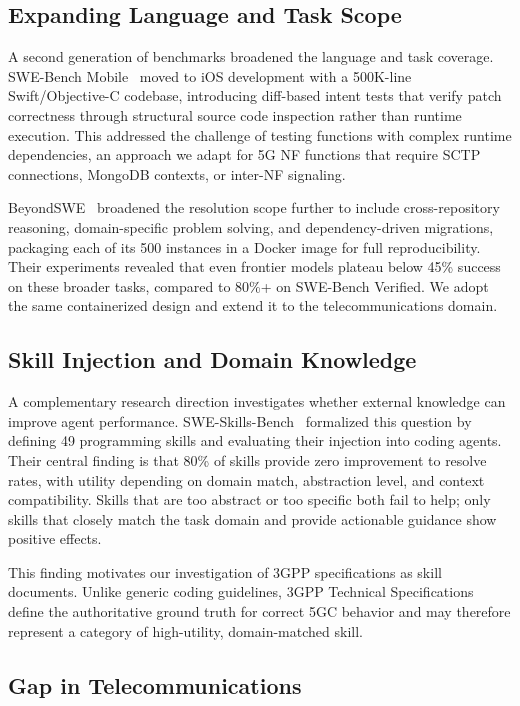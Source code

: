 \documentclass[10pt,conference]{IEEEtran}
\begin{document}
\subsection{Expanding Language and Task Scope}

A second generation of benchmarks broadened the language and task coverage. SWE-Bench Mobile~\cite{yao2025swebenchmobile} moved to iOS development with a 500K-line Swift/Objective-C codebase, introducing diff-based intent tests that verify patch correctness through structural source code inspection rather than runtime execution. This addressed the challenge of testing functions with complex runtime dependencies, an approach we adapt for 5G NF functions that require SCTP connections, MongoDB contexts, or inter-NF signaling.

BeyondSWE~\cite{shi2025beyondswe} broadened the resolution scope further to include cross-repository reasoning, domain-specific problem solving, and dependency-driven migrations, packaging each of its 500 instances in a Docker image for full reproducibility. Their experiments revealed that even frontier models plateau below 45\% success on these broader tasks, compared to 80\%+ on SWE-Bench Verified. We adopt the same containerized design and extend it to the telecommunications domain.

\subsection{Skill Injection and Domain Knowledge}

A complementary research direction investigates whether external knowledge can improve agent performance. SWE-Skills-Bench~\cite{han2025sweskills} formalized this question by defining 49 programming skills and evaluating their injection into coding agents. Their central finding is that 80\% of skills provide zero improvement to resolve rates, with utility depending on domain match, abstraction level, and context compatibility. Skills that are too abstract or too specific both fail to help; only skills that closely match the task domain and provide actionable guidance show positive effects.

This finding motivates our investigation of 3GPP specifications as skill documents. Unlike generic coding guidelines, 3GPP Technical Specifications define the authoritative ground truth for correct 5GC behavior and may therefore represent a category of high-utility, domain-matched skill.

\subsection{Gap in Telecommunications}
\end{document}
